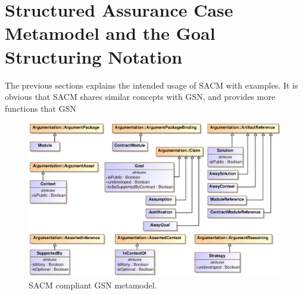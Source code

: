 \section{Structured Assurance Case Metamodel and the Goal Structuring Notation}
The previous sections explains the intended usage of SACM with examples. It is obvious that SACM shares similar concepts with GSN, and provides more functions that GSN 
\begin{figure}
	\centering
	\includegraphics[width=1\linewidth]{GSN.eps}
	\caption{SACM compliant GSN metamodel.}
	\label{fig:asCitedClaim}
\end{figure}